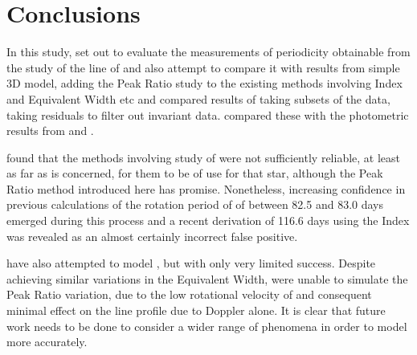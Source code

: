 \chapter{Conclusions}
\protect\label{chapter:conclusions}

In this study, {\Firstp} set out to evaluate the measurements of periodicity obtainable from the study of the {\ha} line
of {\prox} and also attempt to compare it with results from {\Firstposs} simple 3D model, adding the Peak Ratio study to
the existing methods involving {\ha} Index and Equivalent Width etc and compared results of taking subsets of the data,
taking residuals to filter out invariant data. {\FirstP} compared these with the photometric results from {\asas} and {\hst}.

{\FirstP} found that the methods involving study of {\ha} were not sufficiently reliable, at least as far as {\prox} is
concerned, for them to be of use for that star, although the Peak Ratio method introduced here has promise. Nonetheless,
increasing confidence in previous calculations of the rotation period of {\prox} of between 82.5 and 83.0 days emerged
during this process and a recent derivation of 116.6 days using the {\ha} Index was revealed as an almost certainly
incorrect false positive.

{\FirstP} have also attempted to model \prox, but with only very limited success. Despite achieving similar variations
in the Equivalent Width, {\Firstp} were unable to simulate the Peak Ratio variation, due to the low rotational velocity
of {\prox} and consequent minimal effect on the line profile due to Doppler alone. It is clear that future work needs to
be done to consider a wider range of phenomena in order to model {\prox} more accurately.

